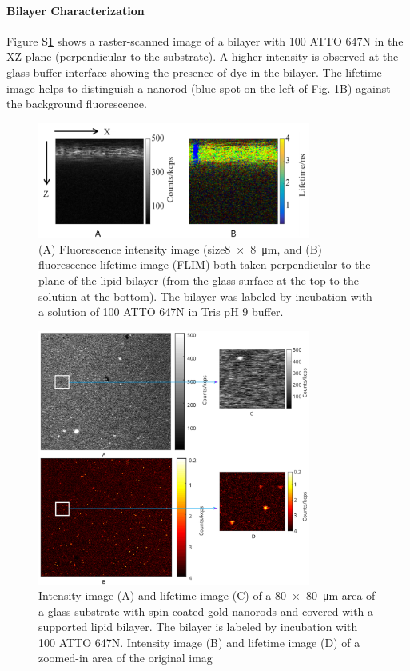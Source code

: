 \paragraph*{Bilayer Characterization}
Figure S\ref{SIfig:xz-scan} shows a raster-scanned image of a bilayer with \SI{100}{\nM} ATTO 647N in the XZ plane (perpendicular to the substrate). 
A higher intensity is observed at the glass-buffer interface showing the presence of dye in the bilayer.
The lifetime image helps to distinguish a nanorod (blue spot on the left of Fig. \ref{SIfig:xz-scan}B) against the background fluorescence.
\begin{figure}%
  \centering
  \includegraphics[width=0.8\textwidth]{xz_scan}
  \makeatletter
  \renewcommand{\fnum@figure}{\figurename~S\thefigure}
  \makeatother{}
  \caption{(A) Fluorescence intensity image (size\SI[product-units=repeat]{8x8}{\um}, and (B) fluorescence lifetime image (FLIM) both taken perpendicular to the plane of the lipid bilayer (from the glass surface at the top to the solution at the bottom).
  The bilayer was labeled by incubation with a solution of \SI{100}{\nM} ATTO 647N in Tris pH 9 buffer.}
  \label{SIfig:xz-scan}
\end{figure}

\begin{figure}%
  \centering
  \includegraphics[width=0.8\textwidth]{xy_with_zoom}
  \makeatletter
  \renewcommand{\fnum@figure}{\figurename~S\thefigure}
  \makeatother{}
  \caption{ Intensity image (A) and lifetime image (C) of a \SI[product-units=repeat]{80x80}{\um} area of a glass substrate with spin-coated gold nanorods and covered with a supported lipid bilayer.
  The bilayer is labeled by incubation with \SI{100}{\nM} ATTO 647N.
  Intensity image (B) and lifetime image (D) of a zoomed-in area of the original imag}
  \label{SIfig:xy-scan}
\end{figure}

